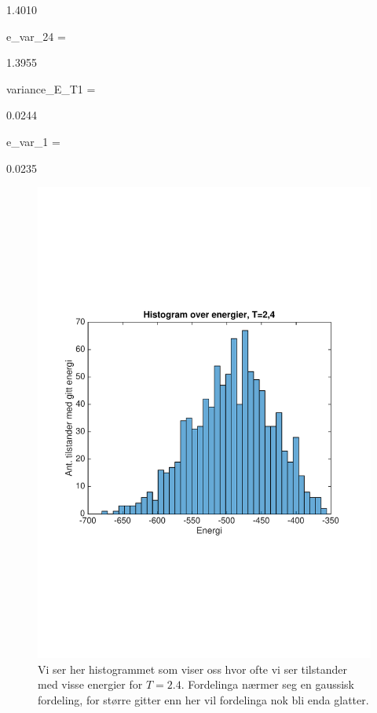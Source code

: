 \documentclass[norsk, 10pt]{article}
\begin{document}
    1.4010


e_var_24 =

    1.3955


variance_E_T1 =

    0.0244


e_var_1 =

    0.0235

\begin{figure}[H]
	\centering
	\includegraphics[scale = 0.6, trim = 1cm 8cm 1cm 8cm]{histogram_T24_L20.pdf}
	\caption{Vi ser her histogrammet som viser oss hvor ofte vi ser tilstander med visse energier for $T=2.4$. Fordelinga nærmer seg en gaussisk fordeling, for større gitter enn her vil fordelinga nok bli enda glatter.}
	\label{fig:histT24}
\end{figure}
\end{document}
